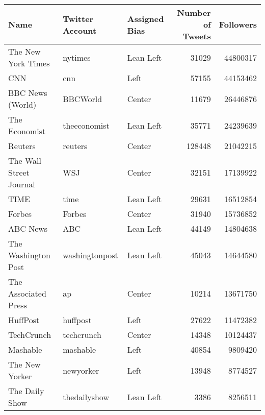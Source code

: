 \begin{tabular}{lllrr}
\toprule
                                     Name &  Twitter Account & Assigned Bias &  Number of Tweets &  Followers \\
\midrule
                       The New York Times &          nytimes &     Lean Left &             31029 &   44800317 \\
                                      CNN &              cnn &          Left &             57155 &   44153462 \\
                         BBC News (World) &         BBCWorld &        Center &             11679 &   26446876 \\
                            The Economist &     theeconomist &     Lean Left &             35771 &   24239639 \\
                                  Reuters &          reuters &        Center &            128448 &   21042215 \\
                  The Wall Street Journal &              WSJ &        Center &             32151 &   17139922 \\
                                     TIME &             time &     Lean Left &             29631 &   16512854 \\
                                   Forbes &           Forbes &        Center &             31940 &   15736852 \\
                                 ABC News &              ABC &     Lean Left &             44149 &   14804638 \\
                      The Washington Post &   washingtonpost &     Lean Left &             45043 &   14644580 \\
                     The Associated Press &               ap &        Center &             10214 &   13671750 \\
                                 HuffPost &         huffpost &          Left &             27622 &   11472382 \\
                               TechCrunch &       techcrunch &        Center &             14348 &   10124437 \\
                                 Mashable &         mashable &          Left &             40854 &    9809420 \\
                           The New Yorker &        newyorker &          Left &             13948 &    8774527 \\
                           The Daily Show &     thedailyshow &     Lean Left &              3386 &    8256511 \\

\end{tabular}

